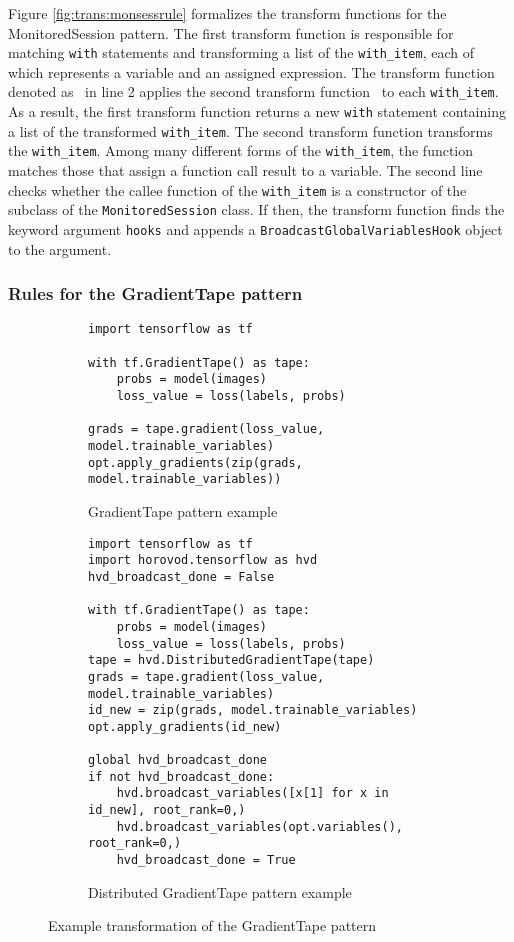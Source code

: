 \vspace{-1em}

Figure \ref{fig:trans:monsessrule} formalizes the transform functions for the
MonitoredSession pattern.
The first transform function is responsible for matching {\tt with} statements
and transforming a list of the {\tt with\_item}, each of which represents a
variable and an assigned expression. 
The transform function denoted as \fkwwithitem~in line 2 applies the second
transform function \fkwithitem~to each {\tt with\_item}.
As a result, the first transform function returns a new {\tt with} statement
containing a list of the transformed {\tt with\_item}.
The second transform function transforms the {\tt with\_item}.
Among many different forms of the {\tt with\_item}, the function matches those
that assign a function call result to a variable.
The second line checks whether the callee function of the {\tt with\_item} is a
constructor of the subclass of the {\tt MonitoredSession} class. 
If then, the transform function finds the keyword argument {\tt hooks} and
appends a {\tt BroadcastGlobalVariablesHook} object to the argument.

\subsubsection{Rules for the GradientTape pattern}

\begin{figure}[ht!]
  \centering
  \begin{subfigure}[t]{0.4\textwidth}
    \begin{lstlisting}[style=mpython]
import tensorflow as tf

with tf.GradientTape() as tape:
    probs = model(images)
    loss_value = loss(labels, probs)

grads = tape.gradient(loss_value, model.trainable_variables)
opt.apply_gradients(zip(grads, model.trainable_variables))\end{lstlisting}
    \caption{GradientTape pattern example}
  \end{subfigure}
  \hspace{5mm}
  \begin{subfigure}[t]{0.55\textwidth}
    \begin{lstlisting}[style=mpython]
import tensorflow as tf
import horovod.tensorflow as hvd
hvd_broadcast_done = False

with tf.GradientTape() as tape:
    probs = model(images)
    loss_value = loss(labels, probs)
tape = hvd.DistributedGradientTape(tape)
grads = tape.gradient(loss_value, model.trainable_variables)
id_new = zip(grads, model.trainable_variables)
opt.apply_gradients(id_new)

global hvd_broadcast_done
if not hvd_broadcast_done:
    hvd.broadcast_variables([x[1] for x in id_new], root_rank=0,)
    hvd.broadcast_variables(opt.variables(), root_rank=0,)
    hvd_broadcast_done = True\end{lstlisting}
    \caption{Distributed GradientTape pattern example}
  \end{subfigure}
  \caption{Example transformation of the GradientTape pattern}
  \label{fig:trans:gtapetrans}
\end{figure}



